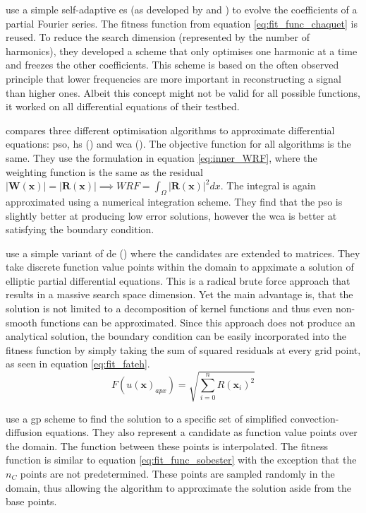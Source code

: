 \documentclass[./\jobname.tex,hidelinks]{subfiles}
\begin{document}
\cite{chaquet_solving_2012} use a simple self-adaptive \gls{es} (as developed by \cite{schwefel_evolutionsstrategien_1977} and \cite{rechenberg_evolutionsstrategien_1978}) to evolve the coefficients of a partial Fourier series. The fitness function from equation \ref{eq:fit_func_chaquet} is reused. To reduce the search dimension (represented by the number of harmonics), they developed a scheme that only optimises one harmonic at a time and freezes the other coefficients. This scheme is based on the often observed principle that lower frequencies are more important in reconstructing a signal than higher ones. Albeit this concept might not be valid for all possible functions, it worked on all differential equations of their testbed. 

\cite{sadollah_metaheuristic_2017} compares three different optimisation algorithms to approximate differential equations: \gls{pso}, \gls{hs} (\cite{geem_new_2001}) and \gls{wca} (\cite{eskandar_water_2012}). The objective function for all algorithms is the same. They use the formulation in equation \ref{eq:inner_WRF}, where the weighting function is the same as the residual $|\mathbf{W}(\mathbf{x})| = |\mathbf{R}(\mathbf{x})| \implies WRF = \int_{\Omega} |\mathbf{R}(\mathbf{x})|^2 dx$. The integral is again approximated using a numerical integration scheme. They find that the \gls{pso} is slightly better at producing low error solutions, however the \gls{wca} is better at satisfying the boundary condition. 

\cite{fateh_differential_2019} use a simple variant of \gls{de} (\cite{storn_differential_1997}) where the candidates are extended to matrices. They take discrete function value points within the domain to appximate a solution of elliptic partial differential equations. This is a radical brute force approach that results in a massive search space dimension. Yet the main advantage is, that the solution is not limited to a decomposition of kernel functions and thus even non-smooth functions can be approximated. Since this approach does not produce an analytical solution, the boundary condition can be easily incorporated into the fitness function by simply taking the sum of squared residuals at every grid point, as seen in equation \ref{eq:fit_fateh}.
\begin{equation}
\label{eq:fit_fateh}
F(u(\mathbf{x})_{apx}) = \sqrt{\sum_{i=0}^{n} R(\mathbf{x}_i)^2}
\end{equation}

\cite{howard_genetic_2011} use a \gls{gp} scheme to find the solution to a specific set of simplified convection-diffusion equations. They also represent a candidate as function value points over the domain. The function between these points is interpolated. The fitness function is similar to equation \ref{eq:fit_func_sobester} with the exception that the $n_C$ points are not predetermined. These points are sampled randomly in the domain, thus allowing the algorithm to approximate the solution aside from the base points. 
\end{document}
